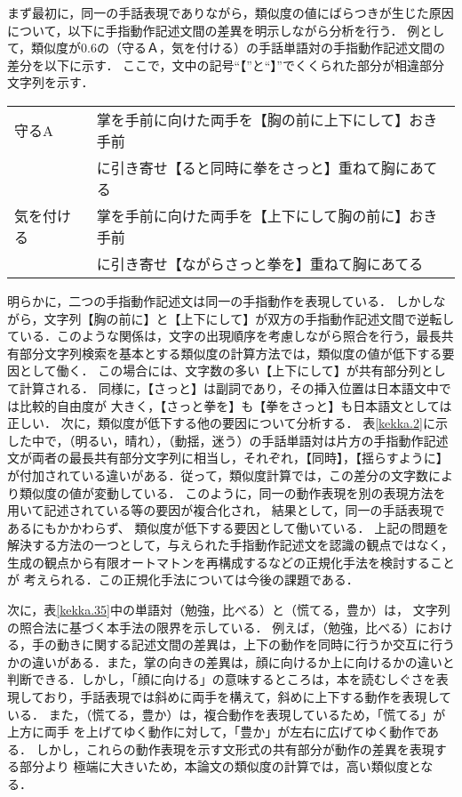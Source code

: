 まず最初に，同一の手話表現でありながら，類似度の値にばらつきが生じた原因について，以下に手指動作記述文間の差異を明示しながら分析を行う．
例として，類似度が0.6の（守るＡ，気を付ける）の手話単語対の手指動作記述文間の差分を以下に示す．
ここで，文中の記号``【''と``】''でくくられた部分が相違部分文字列を示す．

\begin{center}
\begin{tabular}{ll}
守るA & 掌を手前に向けた両手を【胸の前に上下にして】おき手前\\
      & に引き寄せ【ると同時に拳をさっと】重ねて胸にあてる\\
気を付ける & 掌を手前に向けた両手を【上下にして胸の前に】おき手前\\
      & に引き寄せ【ながらさっと拳を】重ねて胸にあてる\\
\end{tabular}
\end{center}
\bigskip

明らかに，二つの手指動作記述文は同一の手指動作を表現している．
しかしながら，文字列【胸の前に】と【上下にして】が双方の手指動作記述文間で逆転している．このような関係は，文字の出現順序を考慮しながら照合を行う，最長共有部分文字列検索を基本とする類似度の計算方法では，類似度の値が低下する要因として働く．
この場合には、文字数の多い【上下にして】が共有部分列として計算される．
同様に，【さっと】は副詞であり，その挿入位置は日本語文中では比較的自由度が
大きく，【さっと拳を】も【拳をさっと】も日本語文としては正しい．
次に，類似度が低下する他の要因について分析する．
表\ref{kekka.2}に示した中で，（明るい，晴れ），（動揺，迷う）の手話単語対は片方の手指動作記述文が両者の最長共有部分文字列に相当し，それぞれ，【同時】，【揺らすように】が付加されている違いがある．従って，類似度計算では，この差分の文字数により類似度の値が変動している．
このように，同一の動作表現を別の表現方法を用いて記述されている等の要因が複合化され，
結果として，同一の手話表現であるにもかかわらず、
類似度が低下する要因として働いている．
上記の問題を解決する方法の一つとして，与えられた手指動作記述文を認識の観点ではなく，生成の観点から有限オートマトンを再構成するなどの正規化手法を検討することが
考えられる．この正規化手法については今後の課題である．

次に，表\ref{kekka.35}中の単語対（勉強，比べる）と（慌てる，豊か）は，
文字列の照合法に基づく本手法の限界を示している．
例えば，（勉強，比べる）における，手の動きに関する記述文間の差異は，上下の動作を同時に行うか交互に行うかの違いがある．また，掌の向きの差異は，顔に向けるか上に向けるかの違いと判断できる．しかし，「顔に向ける」の意味するところは，本を読むしぐさを表現しており，手話表現では斜めに両手を構えて，斜めに上下する動作を表現している．
また，（慌てる，豊か）は，複合動作を表現しているため，「慌てる」が上方に両手
を上げてゆく動作に対して，「豊か」が左右に広げてゆく動作である．
しかし，これらの動作表現を示す文形式の共有部分が動作の差異を表現する部分より
極端に大きいため，本論文の類似度の計算では，高い類似度となる．

